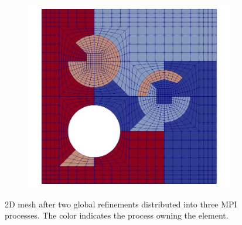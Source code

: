\documentclass[times,doublespace]{nmeauth}
\begin{document}
\begin{figure}[!ht]
  \centering
  \begin{subfigure}[b]{0.8\textwidth}
    \centering
    \includegraphics[width=\textwidth]{fine_level_2d.png}
  \end{subfigure}
  \caption{2D mesh after two global refinements distributed into three MPI processes. The color indicates the process owning the element.}%
  \label{fig:miehe_fine_level}
\end{figure}
\end{document}
